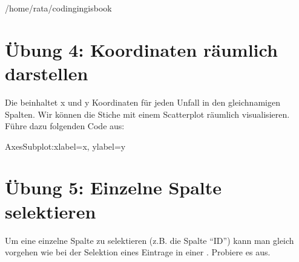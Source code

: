 \documentclass[letterpaper,10pt,english]{sphinxmanual}
\begin{document}
\begin{sphinxVerbatim}[commandchars=\\\{\}]
 

\end{sphinxVerbatim}

\begin{sphinxVerbatim}[commandchars=\\\{\}]
\PYGZsq{}/home/rata/codingingis\PYGZus{}book\PYGZsq{}
\end{sphinxVerbatim}


\section{Übung 4: Koordinaten räumlich darstellen}
\label{\detokenize{01_04_Tabellarische_Daten:ubung-4-koordinaten-raumlich-darstellen}}
Die   beinhaltet x und y Koordinaten für jeden Unfall in den gleichnamigen Spalten. Wir können die Stiche mit einem Scatterplot räumlich visualisieren. Führe dazu folgenden Code aus:

\begin{sphinxVerbatim}[commandchars=\\\{\}]
\end{sphinxVerbatim}

\begin{sphinxVerbatim}[commandchars=\\\{\}]
\PYGZlt{}AxesSubplot:xlabel=\PYGZsq{}x\PYGZsq{}, ylabel=\PYGZsq{}y\PYGZsq{}\PYGZgt{}
\end{sphinxVerbatim}

\noindent{}


\section{Übung 5: Einzelne Spalte selektieren}
\label{\detokenize{01_04_Tabellarische_Daten:ubung-5-einzelne-spalte-selektieren}}
Um eine einzelne Spalte zu selektieren (z.B. die Spalte “ID”) kann man gleich vorgehen wie bei der Selektion eines Eintrage in einer . Probiere es aus.
\end{document}
